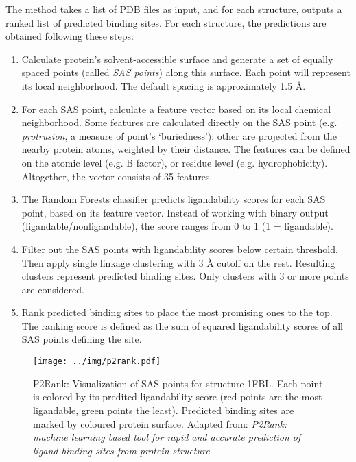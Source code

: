 The method takes a list of PDB files as input, and for each structure, outputs a ranked list of predicted binding sites. For each structure, the predictions are obtained following these steps: \cite{p2rank1, p2rank2}

\begin{enumerate}
\item Calculate protein's solvent-accessible surface \cite{shrake} and generate a set of equally spaced points (called \textit{SAS points}) along this surface. Each point will represent its local neighborhood. The default spacing is approximately 1.5 {\AA}. 
\item For each SAS point, calculate a feature vector based on its local chemical neighborhood. Some features are calculated directly on the SAS point (e.g. \textit{protrusion}, a measure of point's `buriedness'); other are projected from the nearby protein atoms, weighted by their distance. The features can be defined on the atomic level (e.g. B factor), or residue level (e.g. hydrophobicity). Altogether, the vector consists of 35 features.
\item The Random Forests classifier predicts ligandability scores for each SAS point, based on its feature vector. Instead of working with binary output (ligandable/nonligandable), the score ranges from 0 to 1 (1 = ligandable).
\item Filter out the SAS points with ligandability scores below certain threshold. Then apply single linkage clustering with 3 {\AA} cutoff on the rest. Resulting clusters represent predicted binding sites. Only clusters with 3 or more points are considered.
\item Rank predicted binding sites to place the most promising ones to the top. The ranking score is defined as the sum of squared ligandability scores of all SAS points defining the site.
\end{enumerate}

\begin{figure}[!h]\centering
\texttt{[image: ../img/p2rank.pdf]}
\caption[P2Rank: Visualization of SAS points for structure 1FBL]{P2Rank: Visualization of SAS points for structure 1FBL. Each point is colored by its predited ligandability score (red points are the most ligandable, green points the least). Predicted binding sites are marked by coloured protein surface. Adapted from: \textit{P2Rank: machine learning based tool for rapid and accurate prediction of ligand binding sites from protein structure} \cite{p2rank1}}
\label{fig:p2rank}
\end{figure}

